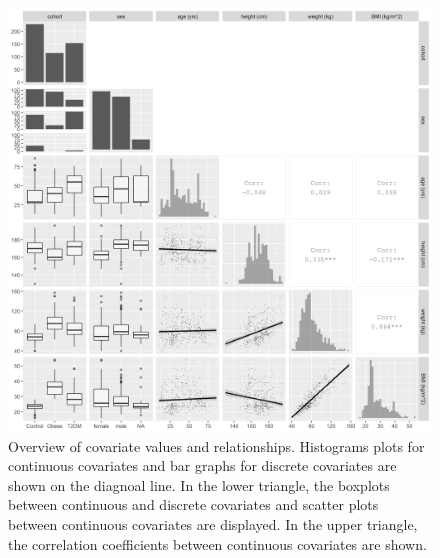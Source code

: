 \documentclass[utf8]{frontiersSCNS} %
\begin{document}
\begin{figure}[h!]
\begin{center}
\includegraphics[width=15cm]{p2.PNG}
\end{center}
\caption{Overview of covariate values and relationships. Histograms plots for continuous covariates and bar graphs for discrete covariates are shown on the diagnoal line. In the lower triangle, the boxplots between continuous and discrete covariates and scatter plots between continuous covariates are displayed. In the upper triangle, the correlation coefficients between continuous covariates are shown.}
\label{fig: cova}
\end{figure}
\end{document}

